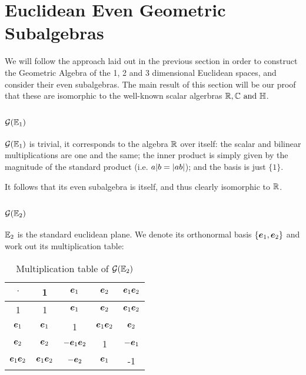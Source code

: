 \section{Euclidean Even Geometric Subalgebras}

We will follow the approach laid out in the previous section in order to construct the Geometric Algebra of the 1, 2 and 3 dimensional Euclidean spaces, and consider their even subalgebras.
The main result of this section will be our proof that these are isomorphic to the well-known scalar algerbras $\R, \C \mathrm{\ and\ } \HM$.

\subsection{$\mathcal{G}(\mathbb{E}_1)$}

$\mathcal{G}(\mathbb{E}_1)$  is trivial, it corresponds to the algebra $\mathbb{R}$ over itself: the scalar and bilinear multiplications are one and the same; the inner product is simply given by the magnitude of the standard product (i.e. $a | b = \left|ab\right|$); and the basis is just $\{1\}$.

It follows that its even subalgebra is itself, and thus clearly isomorphic to $\mathbb{R}$.

\subsection{$\mathcal{G}(\mathbb{E}_2)$}

$\mathbb{E}_2$ is the standard euclidean plane. We denote its orthonormal basis $\{\boldsymbol{e}_1, \boldsymbol{e}_2\}$ and work out its multiplication table:
\begin{table}[h!]
	\centering
	\begin{tabular}{|c|c|c|c|c|}
		\hline
		$\cdot$ & 1 & $\boldsymbol{e}_1$ & $\boldsymbol{e}_2$ & $\boldsymbol{e}_1\boldsymbol{e}_2$ \\
		\hline
		1 & 1 & $\boldsymbol{e}_1$ & $\boldsymbol{e}_2$ & $\boldsymbol{e}_1\boldsymbol{e}_2$ \\
		\hline
		$\boldsymbol{e}_1$ & $\boldsymbol{e}_1$ & 1 & $\boldsymbol{e}_1\boldsymbol{e}_2$ & $\boldsymbol{e}_2$ \\
		\hline
		$\boldsymbol{e}_2$ & $\boldsymbol{e}_2$ & $-\boldsymbol{e}_1\boldsymbol{e}_2$ & 1 & $-\boldsymbol{e}_1$ \\
		\hline
		$\boldsymbol{e}_1\boldsymbol{e}_2$ & $\boldsymbol{e}_1\boldsymbol{e}_2$ & $-\boldsymbol{e}_2$ & $\boldsymbol{e}_1$ & -1 \\
		\hline
	\end{tabular}
	\caption{Multiplication table of $\mathcal{G}(\mathbb{E}_2)$}
	\label{ta:mt2}
\end{table}

